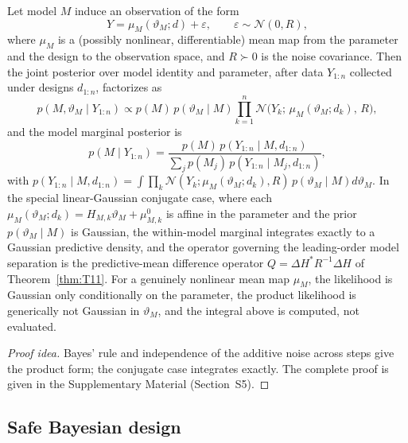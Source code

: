 \begin{theorem}
\label{thm:T18}
Let model $M$ induce an observation of the form
\begin{equation}
Y = \mu_M(\vartheta_M; d) + \varepsilon,\qquad
\varepsilon \sim \mathcal{N}(0, R),
\label{eq:bayes_obs}
\end{equation}
where $\mu_M$ is a (possibly nonlinear, differentiable) mean map from the parameter and the design to the observation space, and $R \succ 0$ is the noise covariance. Then the joint posterior over model identity and parameter, after data $Y_{1:n}$ collected under designs $d_{1:n}$, factorizes as
\begin{equation}
p(M, \vartheta_M \mid Y_{1:n})
\propto p(M)\, p(\vartheta_M \mid M)
\prod_{k=1}^{n} \mathcal{N}\!\bigl(Y_k;\, \mu_M(\vartheta_M; d_k),\, R\bigr),
\label{eq:bayes_posterior}
\end{equation}
and the model marginal posterior is
\begin{equation}
p(M \mid Y_{1:n})
= \frac{p(M)\, p(Y_{1:n} \mid M, d_{1:n})}{\sum_{j} p(M_j)\, p(Y_{1:n} \mid M_j, d_{1:n})},
\label{eq:bayes_model_post}
\end{equation}
with $p(Y_{1:n} \mid M, d_{1:n}) = \int \prod_{k} \mathcal{N}(Y_k; \mu_M(\vartheta_M; d_k), R)\, p(\vartheta_M \mid M) d\vartheta_M$. In the special linear-Gaussian conjugate case, where each $\mu_M(\vartheta_M; d_k) = H_{M,k} \vartheta_M + \mu_{M,k}^{0}$ is affine in the parameter and the prior $p(\vartheta_M \mid M)$ is Gaussian, the within-model marginal integrates exactly to a Gaussian predictive density, and the operator governing the leading-order model separation is the predictive-mean difference operator $Q = \Delta H^{*} R^{-1} \Delta H$ of Theorem~\ref{thm:T11}. For a genuinely nonlinear mean map $\mu_M$, the likelihood is Gaussian only conditionally on the parameter, the product likelihood is generically not Gaussian in $\vartheta_M$, and the integral above is computed, not evaluated.
\end{theorem}
\begin{proof}[Proof idea]
Bayes' rule and independence of the additive noise across steps give the product form; the conjugate case integrates exactly. The complete proof is given in the Supplementary Material (Section~S5).
\end{proof}

\subsection{Safe Bayesian design}

